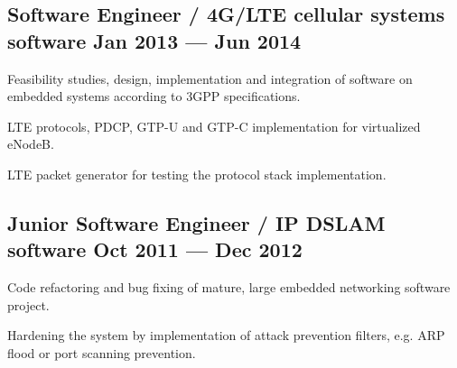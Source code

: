 \documentclass[letter,10pt]{article}
\begin{document}
\subsection{{Software Engineer / 4G/LTE cellular systems software \hfill Jan 2013 --- Jun 2014}}
\begin{zitemize}
\item Feasibility studies, design, implementation and integration of software on embedded systems according to 3GPP specifications.
\item LTE protocols, PDCP, GTP-U and GTP-C implementation for virtualized eNodeB.
\item LTE packet generator for testing the protocol stack implementation.
\end{zitemize}

\subsection{{Junior Software Engineer / IP DSLAM software \hfill Oct 2011 --- Dec 2012}}
\begin{zitemize}
\item Code refactoring and bug fixing of mature, large embedded networking software project.
\item Hardening the system by implementation of attack prevention filters, e.g. ARP flood or port scanning prevention.
\end{zitemize}
\end{document}
